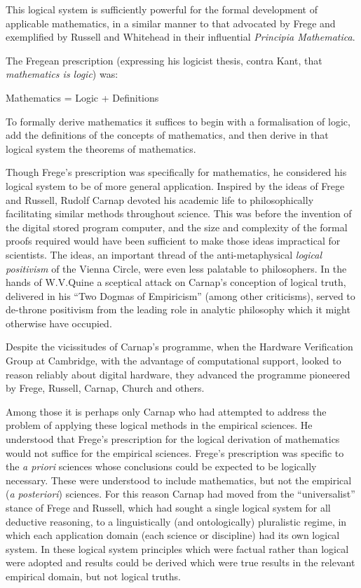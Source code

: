 \documentclass[10pt,titlepage]{book}
\begin{document}
This logical system is sufficiently powerful for the formal development of applicable mathematics, in a similar manner to that advocated by Frege and exemplified by Russell and Whitehead in their influential \emph{Principia Mathematica}\cite{russell10}.

The Fregean prescription (expressing his logicist thesis, contra Kant, that \emph{mathematics is logic}) was:

\begin{center}
  Mathematics = Logic + Definitions
\end{center}

To formally derive mathematics it suffices to begin with a formalisation of logic, add the definitions of the concepts of mathematics, and then derive in that logical system the theorems of mathematics.

Though Frege's prescription was specifically for mathematics, he considered his logical system to be of more general application.
Inspired by the ideas of Frege and Russell, Rudolf Carnap devoted his academic life to philosophically facilitating similar methods throughout science.
This was before the invention of the digital stored program computer, and the size and complexity of the formal proofs required would have been sufficient to make those ideas impractical for scientists.
The ideas, an important thread of the anti-metaphysical \emph{logical positivism} of the Vienna Circle, were even less palatable to philosophers.
In the hands of W.V.Quine a sceptical attack on Carnap's conception of logical truth, delivered in his ``Two Dogmas of Empiricism''\cite{quine53} (among other criticisms), served to de-throne positivism from the leading role in analytic philosophy which it might otherwise have occupied.

Despite the vicissitudes of Carnap's programme, when the Hardware Verification Group at Cambridge, with the advantage of computational support, looked to reason reliably about digital hardware, they advanced the programme pioneered by Frege, Russell, Carnap, Church and others.

Among those it is perhaps only Carnap who had attempted to address the problem of applying these logical methods in the empirical sciences.
He understood that Frege's prescription for the logical derivation of mathematics would not suffice for the empirical sciences.
Frege's prescription was specific to the \emph{a priori} sciences whose conclusions could be expected to be logically necessary.
These were understood to include mathematics, but not the empirical (\emph{a posteriori}) sciences.
For this reason Carnap had moved from the ``universalist'' stance of Frege and Russell, which had sought a single logical system for all deductive reasoning, to a linguistically (and ontologically) pluralistic regime, in which each application domain (each science or discipline) had its own logical system.
In these logical system principles which were factual rather than logical were adopted and results could be derived which were true results in the relevant empirical domain, but not logical truths.
\end{document}
